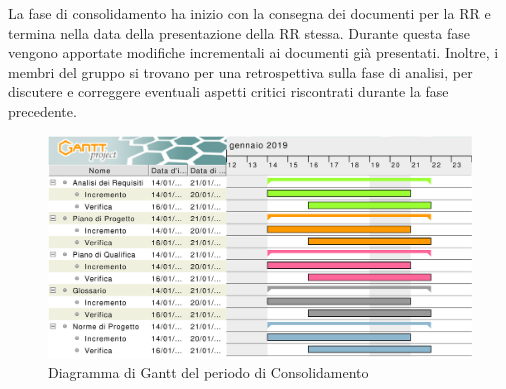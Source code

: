 La fase di consolidamento ha inizio con la consegna dei documenti per la RR e termina nella data della presentazione della RR stessa. \newline
Durante questa fase vengono apportate modifiche incrementali ai documenti già presentati. Inoltre, i membri del gruppo si trovano per una retrospettiva sulla fase di analisi, per discutere e correggere eventuali aspetti critici riscontrati durante la fase precedente.

\begin{figure}[H]
	\includegraphics[width=1\linewidth]{Pianificazione/Consolidamento_Gantt.png}
	\caption{Diagramma di Gantt del periodo di Consolidamento}
\end{figure}